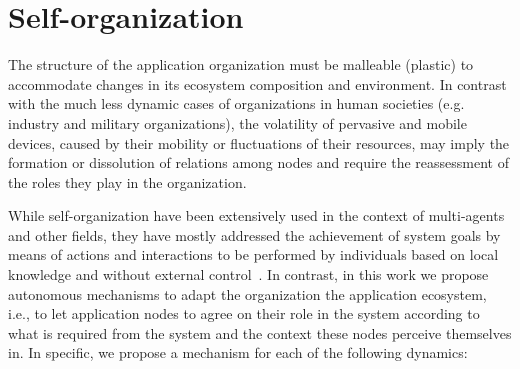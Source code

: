 \section{Self-organization}\label{sec:self_organization}




The structure of the application organization
must be malleable (plastic) to accommodate changes in its ecosystem composition and environment. In contrast with the much less dynamic cases of organizations in human societies (e.g. industry and military organizations), the volatility of pervasive and mobile devices, caused by their mobility or fluctuations of their resources, may imply the formation or dissolution of relations among nodes and require the reassessment of the roles they play in the organization. 

While self-organization have been extensively used in the context of multi-agents and other fields, they have mostly addressed the achievement of system goals by means of actions and interactions to be performed by individuals based on local knowledge and without external control~\cite{}. In contrast, in this work we propose autonomous mechanisms to adapt the organization the application ecosystem, i.e., to let application nodes to agree on their role in the system according to what is required from the system and the context these nodes perceive themselves in. In specific, we propose a mechanism for each of the following dynamics:


